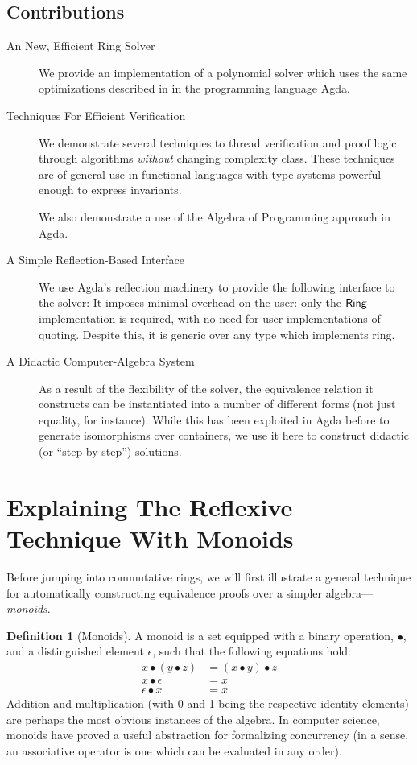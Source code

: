\documentclass[draft, twocolumn]{article}
\theoremstyle{definition}
\newtheorem{definition}{Definition}[section]
\theoremstyle{definition}
\begin{document}
\subsection{Contributions}
\begin{description}
  \item[An New, Efficient Ring Solver]
    We provide an implementation of a polynomial solver which uses the same
    optimizations described in\cite{gregoire_proving_2005} in the programming
    language Agda.
  \item[Techniques For Efficient Verification] We demonstrate several techniques
    to thread verification and proof logic through algorithms \emph{without}
    changing complexity class. These techniques are of general use in functional
    languages with type systems powerful enough to express invariants.

    We also demonstrate a use of the Algebra of Programming approach in
    Agda\cite{mu_algebra_2009}.
  \item[A Simple Reflection-Based Interface] We use Agda's reflection machinery
    to provide the following interface to the solver:
    It imposes minimal overhead on the user: only the \(\AgdaDatatype{Ring}\)
    implementation is required, with no need for user implementations of
    quoting. Despite this, it is generic over any type which implements ring.
  \item[A Didactic Computer-Algebra System] As a result of the flexibility of
    the solver, the equivalence relation it constructs can be instantiated into
    a number of different forms (not just equality, for instance). While this
    has been exploited in Agda before to generate isomorphisms over containers,
    we use it here to construct didactic (or ``step-by-step'') solutions.
\end{description}
\section{Explaining The Reflexive Technique With Monoids}
Before jumping into commutative rings, we will first illustrate a general
technique for automatically constructing equivalence proofs over a simpler
algebra---\emph{monoids}.

\begin{definition}[Monoids]
  A monoid is a set equipped with a binary operation, \(\bullet\), and a
  distinguished element \(\epsilon\), such that the following equations hold:
  \begin{align}
    x \bullet (y \bullet z) &= (x \bullet y) \bullet z \tag{Associativity} \\
    x \bullet \epsilon      &= x \tag{Left Identity} \\
    \epsilon \bullet x      &= x \tag{Right Identity}
  \end{align}
  Addition and multiplication (with 0 and 1 being the respective identity
  elements) are perhaps the most obvious instances of the algebra. In computer
  science, monoids have proved a useful abstraction for formalizing concurrency
  (in a sense, an associative operator is one which can be evaluated in any
  order).
\end{definition}
\end{document}
